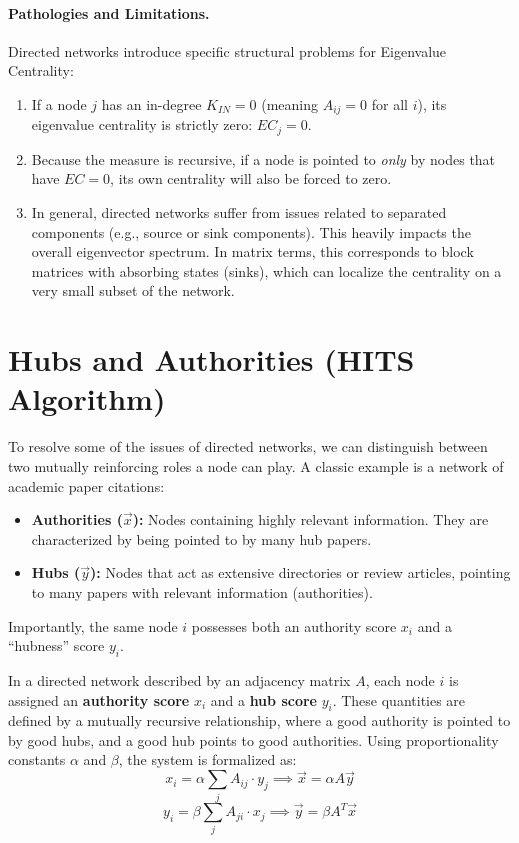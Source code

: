 \paragraph{Pathologies and Limitations.} Directed networks introduce specific structural problems for Eigenvalue Centrality:
\begin{enumerate}
    \item If a node $j$ has an in-degree $K_{IN} = 0$ (meaning $A_{ij} = 0$ for all $i$), its eigenvalue centrality is strictly zero: $EC_j = 0$.
    \item Because the measure is recursive, if a node is pointed to \textit{only} by nodes that have $EC = 0$, its own centrality will also be forced to zero.
    \item In general, directed networks suffer from issues related to separated components (e.g., source or sink components). This heavily impacts the overall eigenvector spectrum. In matrix terms, this corresponds to block matrices with absorbing states (sinks), which can localize the centrality on a very small subset of the network.
\end{enumerate}


\section{Hubs and Authorities (HITS Algorithm)}

To resolve some of the issues of directed networks, we can distinguish between two mutually reinforcing roles a node can play. A classic example is a network of academic paper citations:
\begin{itemize}
    \item \textbf{Authorities ($\vec{x}$):} Nodes containing highly relevant information. They are characterized by being pointed to by many hub papers.
    \item \textbf{Hubs ($\vec{y}$):} Nodes that act as extensive directories or review articles, pointing to many papers with relevant information (authorities).
\end{itemize}
Importantly, the same node $i$ possesses both an authority score $x_i$ and a ``hubness'' score $y_i$.

\begin{definition}
    In a directed network described by an adjacency matrix $A$, each node $i$ is assigned an \textbf{authority score} $x_i$ and a \textbf{hub score} $y_i$. These quantities are defined by a mutually recursive relationship, where a good authority is pointed to by good hubs, and a good hub points to good authorities. Using proportionality constants $\alpha$ and $\beta$, the system is formalized as:
    \[ x_i = \alpha \sum_j A_{ij} \cdot y_j \implies \vec{x} = \alpha A \vec{y} \]
    \[ y_i = \beta \sum_j A_{ji} \cdot x_j \implies \vec{y} = \beta A^T \vec{x} \]
\end{definition}

